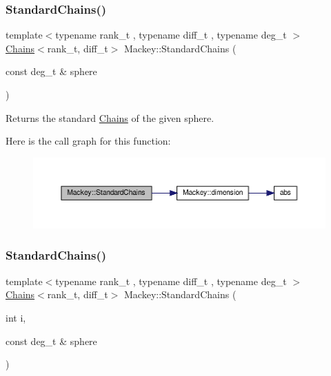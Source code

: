 \subsubsection{\texorpdfstring{Standard\+Chains()}{StandardChains()}\hspace{0.1cm}{\footnotesize\ttfamily [1/2]}}
{\footnotesize\ttfamily template$<$typename rank\+\_\+t , typename diff\+\_\+t , typename deg\+\_\+t $>$ \\
\hyperlink{classMackey_1_1Chains}{Chains}$<$rank\+\_\+t, diff\+\_\+t$>$ Mackey\+::\+Standard\+Chains (\begin{DoxyParamCaption}\item[{const deg\+\_\+t \&}]{sphere }\end{DoxyParamCaption})}



Returns the standard \hyperlink{classMackey_1_1Chains}{Chains} of the given sphere. 

Here is the call graph for this function\+:\nopagebreak
\begin{figure}[H]
\begin{center}
\leavevmode
\includegraphics[width=350pt]{namespaceMackey_a425b988266cedec0299fb539d99179b1_cgraph}
\end{center}
\end{figure}
\mbox{\label{namespaceMackey_aac9deeccbe291d1dd17df46a3d7c1f2b}} 
\subsubsection{\texorpdfstring{Standard\+Chains()}{StandardChains()}\hspace{0.1cm}{\footnotesize\ttfamily [2/2]}}
{\footnotesize\ttfamily template$<$typename rank\+\_\+t , typename diff\+\_\+t , typename deg\+\_\+t $>$ \\
\hyperlink{classMackey_1_1Chains}{Chains}$<$rank\+\_\+t, diff\+\_\+t$>$ Mackey\+::\+Standard\+Chains (\begin{DoxyParamCaption}\item[{int}]{i,  }\item[{const deg\+\_\+t \&}]{sphere }\end{DoxyParamCaption})}



